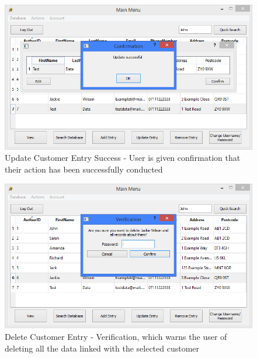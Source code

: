 \begin{figure}[H]
    \caption{Update Customer Entry Success - User is given confirmation that their action has been successfully conducted} \label{fig:UpdateEntrySuccess}
    \includegraphics[width=\textwidth]{./Maintenance/UserInterface/UpdateEntrySuccess.png}
\end{figure}

\begin{figure}[H]
    \caption{Delete Customer Entry - Verification, which warns the user of deleting all the data linked with the selected customer} \label{fig:DeleteEntry}
    \includegraphics[width=\textwidth]{./Maintenance/UserInterface/DeleteEntry.png}
\end{figure}

